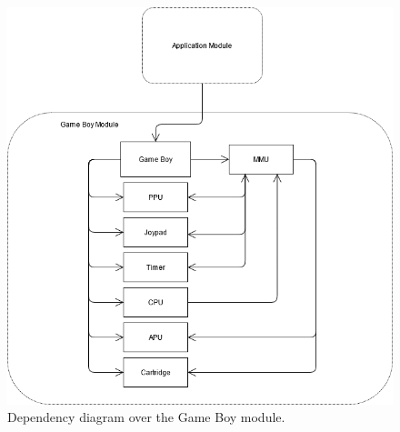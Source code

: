 \newpage
\begin{figure}[H]
    \centering
    \includegraphics[scale=0.55]{figures/Game Boy Dependencies.png}
    \caption{Dependency diagram over the Game Boy module.}
    \label{fig:dependency_diagram}
\end{figure}







